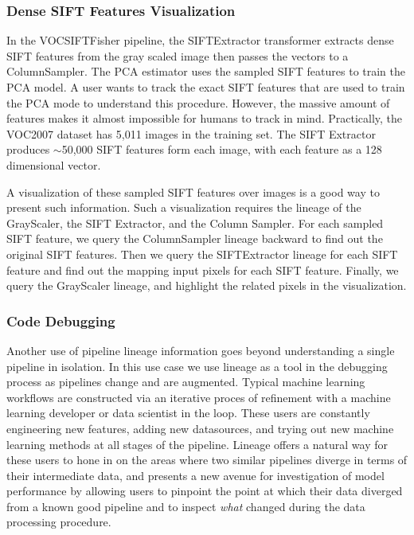 \documentclass{sig-alternate}
\begin{document}
\subsubsection{Dense SIFT Features Visualization}
In the VOCSIFTFisher pipeline, the SIFTExtractor transformer extracts dense SIFT features from the gray scaled image then passes the vectors to a ColumnSampler.
The PCA estimator uses the sampled SIFT features to train the PCA model. 
A user wants to track the exact SIFT features that are used to train the PCA mode to understand this procedure.
However, the massive amount of features makes it almost impossible for humans to track in mind.
Practically, the VOC2007 dataset has 5,011 images in the training set. 
The SIFT Extractor produces $\sim$50,000 SIFT features form each image, with each feature as a 128 dimensional vector.

A visualization of these sampled SIFT features over images is a good way to present such information.
Such a visualization requires the lineage of the GrayScaler, the SIFT Extractor, and the Column Sampler.
For each sampled SIFT feature, we query the ColumnSampler lineage backward to find out the original SIFT features.
Then we query the SIFTExtractor lineage for each SIFT feature and find out the mapping input pixels for each SIFT feature.
Finally, we query the GrayScaler lineage, and highlight the related pixels in the visualization.

\subsubsection{Code Debugging}
Another use of pipeline lineage information goes beyond understanding a single pipeline in isolation.
In this use case we use lineage as a tool in the debugging process as pipelines change and are augmented. 
Typical machine learning workflows are constructed via an iterative proces of refinement with a machine learning developer or data scientist in the loop.
These users are constantly engineering new features, adding new datasources, and trying out new machine learning methods at all stages of the pipeline.
Lineage offers a natural way for these users to hone in on the areas where two similar pipelines diverge in terms of their intermediate data, and presents a new avenue for investigation of model performance by allowing users to pinpoint the point at which their data diverged from a known good pipeline and to inspect \emph{what} changed during the data processing procedure. 
\end{document}
